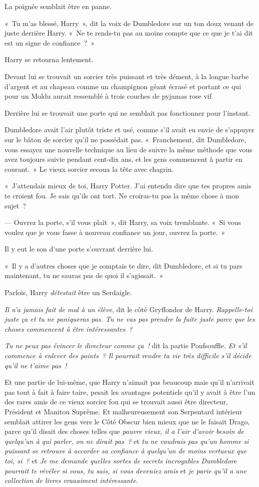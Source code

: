 La poignée semblait être en panne.

«~Tu m'as blessé, Harry~», dit la voix de Dumbledore sur un ton doux venant de juste derrière Harry. «~Ne te rends-tu pas au moins compte que ce que je t'ai dit est un signe de confiance~?~»

Harry se retourna lentement.

Devant lui se trouvait un sorcier très puissant et très dément, à la longue barbe d'argent et au chapeau comme un champignon géant écrasé et portant ce qui pour un Moldu aurait ressemblé à trois couches de pyjamas rose vif.

Derrière lui se trouvait une porte qui ne semblait pas fonctionner pour l'instant.

Dumbledore avait l'air plutôt triste et usé, comme s'il avait eu envie de s'appuyer sur le bâton de sorcier qu'il ne possédait pas. «~Franchement, dit Dumbledore, vous essayez une nouvelle technique au lieu de suivre la même méthode que vous avez toujours suivie pendant cent-dix ans, et les gens commencent à partir en courant.~» Le vieux sorcier secoua la tête avec chagrin.

«~J'attendais mieux de toi, Harry Potter. J'ai entendu dire que tes propres amis te croient fou. Je sais qu'ils ont tort. Ne croiras-tu pas la même chose à mon sujet~?

--- Ouvrez la porte, s'il vous plaît~», dit Harry, sa voix tremblante. «~Si vous voulez que je vous fasse à nouveau confiance un jour, ouvrez la porte.~»

Il y eut le son d'une porte s'ouvrant derrière lui.

«~Il y a d'autres choses que je comptais te dire, dit Dumbledore, et si tu pars maintenant, tu ne sauras pas de quoi il s'agissait.~»

Parfois, Harry \emph{détestait} être un Serdaigle.

\emph{Il n'a jamais fait de mal à un élève}, dit le côté Gryffondor de Harry. \emph{Rappelle-toi juste ça et tu ne paniqueras pas. Tu ne vas pas prendre la fuite juste parce que les choses commencent à être intéressantes~?}

\emph{Tu ne peux pas évincer le directeur comme ça~!} dit la partie Poufsouffle. \emph{Et s'il commence à enlever des points~? Il pourrait rendre ta vie très difficile s'il décide qu'il ne t'aime pas~!}

Et une partie de lui-même, que Harry n'aimait pas beaucoup mais qu'il n'arrivait pas tout à fait à faire taire, pesait les avantages potentiels qu'il y avait à être l'un des rares amis de ce vieux sorcier fou qui se trouvait aussi être directeur, Président et Manitou Suprême. Et malheureusement son Serpentard intérieur semblait attirer les gens vers le Côté Obscur bien mieux que ne le faisait Drago, parce qu'il disait des choses telles que \emph{pauvre vieux, il a l'air d'avoir besoin de quelqu'un à qui parler, on ne dirait pas~?} et \emph{tu ne voudrais pas qu'un homme si puissant se retrouve à accorder sa confiance à quelqu'un de moins vertueux que toi, si~?} et \emph{Je me demande quelles sortes de secrets incroyables Dumbledore pourrait te révéler si vous, tu sais, si vous deveniez amis} et \emph{je parie qu'il a une collection de livres vraaaiment intéressante.}

